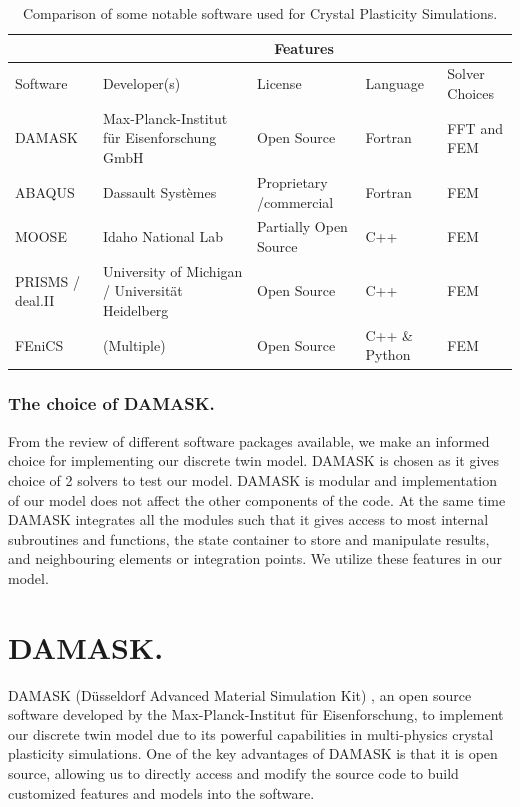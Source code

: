 \begin{table}[H]
\centering
 \caption{Comparison of some notable software used for Crystal Plasticity Simulations.}
\begin{tabular}{ |m{4.3em}||m{4.2cm}|m{2.5cm}|m{1.7cm}|m{2.7cm}| }
 \hline
 & \multicolumn{4}{|c|}{Features} \\
 \hline
 Software& Developer(s) & License & Language & Solver Choices \\
 \hline \hline
 DAMASK &Max-Planck-Institut für Eisenforschung GmbH&Open Source&Fortran& FFT and FEM \\ %
 \hline
 ABAQUS&Dassault Systèmes&Proprietary /commercial&Fortran&FEM \\ %
 \hline
 MOOSE &Idaho National Lab&Partially Open Source&C++&FEM \\ %
 \hline
 PRISMS / deal.II&University of Michigan / Universität Heidelberg&Open Source&C++& FEM \\ %
 \hline
 FEniCS &(Multiple) &Open Source&C++ \& Python& FEM \\ %
 \hline
\end{tabular}

 \label{CP-Software-Comparision}
 \end{table}
 
\subsubsection{The choice of DAMASK.}
From the review of different software packages available, we make an informed choice for implementing our discrete twin model. DAMASK is chosen as it gives choice of 2 solvers to test our model. DAMASK is modular and implementation of our model does not affect the other components of the code. At the same time DAMASK integrates all the modules such that it gives access to most internal subroutines and functions, the state container to store and manipulate results, and neighbouring elements or integration points. We utilize these features in our model.

\section{DAMASK.}
DAMASK (Düsseldorf Advanced Material Simulation Kit) \cite{ROTERS2019420}, an open source software developed by the Max-Planck-Institut für Eisenforschung, to implement our discrete twin model due to its powerful capabilities in multi-physics crystal plasticity simulations. One of the key advantages of DAMASK is that it is open source, allowing us to directly access and modify the source code to build customized features and models into the software.

